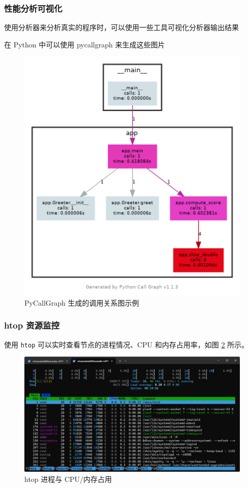 \documentclass[a4paper,12pt]{ctexart}
\begin{document}
\subsubsection{性能分析可视化}

使用分析器来分析真实的程序时，可以使用一些工具可视化分析器输出结果

在 Python 中可以使用 pycallgraph 来生成这些图片
\begin{figure}[htbp]
  \centering
  \includegraphics[width=0.5\linewidth]{callgraph.png}
  \caption{PyCallGraph 生成的调用关系图示例}
  \label{fig:py-callgraph}
\end{figure}


\subsubsection{htop 资源监控}
使用 \texttt{htop} 可以实时查看节点的进程情况、CPU 和内存占用率，如图 \ref{fig:htop} 所示。
\begin{figure}[htbp]
  \centering
  \includegraphics[width=0.9\linewidth]{htop.jpg}
  \caption{htop 进程与 CPU/内存占用}
  \label{fig:htop}
\end{figure}
\end{document}
